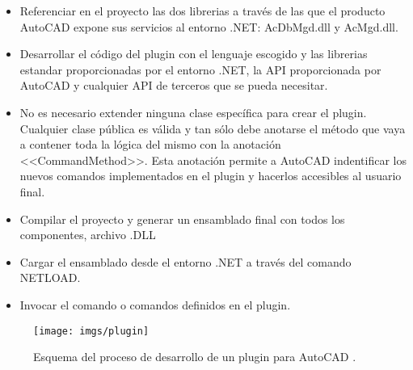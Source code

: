 \begin{itemize}

\item{Referenciar en el proyecto las dos librerias a través de las que el producto AutoCAD expone sus servicios al entorno .NET: AcDbMgd.dll y AcMgd.dll.}

\item{Desarrollar el código del plugin con el lenguaje escogido y las librerias estandar proporcionadas por el entorno .NET, la API proporcionada por AutoCAD y cualquier API de terceros que se pueda necesitar.}

\item{No es necesario extender ninguna clase específica para crear el plugin. Cualquier clase pública es válida y tan sólo debe anotarse el método que vaya a contener toda la lógica del mismo con la anotación <<CommandMethod>>. Esta anotación permite a AutoCAD indentificar los nuevos comandos implementados en el plugin y hacerlos accesibles al usuario final.}

\item{Compilar el proyecto y generar un ensamblado final con todos los componentes, archivo .DLL}

\item{Cargar el ensamblado desde el entorno .NET a través del comando NETLOAD.}

\item{Invocar el comando o comandos definidos en el plugin.}

\end{itemize}

\begin{figure}[H]
\begin{center}
\texttt{[image: imgs/plugin]}
\caption{Esquema del proceso de desarrollo de un plugin para AutoCAD \cite{AutoCAD-NET-API}.}
\end{center}
\end{figure}
